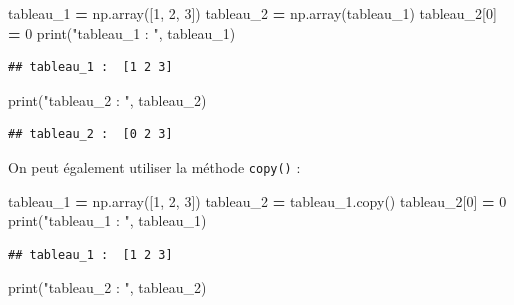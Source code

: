 \documentclass[12pt,]{book}
\newenvironment{Shaded}{\begin{snugshade}}{\end{snugshade}}
\newcommand{\DecValTok}[1]{\textcolor[rgb]{0.00,0.00,0.81}{#1}}
\newcommand{\StringTok}[1]{\textcolor[rgb]{0.31,0.60,0.02}{#1}}
\newcommand{\OperatorTok}[1]{\textcolor[rgb]{0.81,0.36,0.00}{\textbf{#1}}}
\newcommand{\BuiltInTok}[1]{#1}
\newcommand{\NormalTok}[1]{#1}
\numberwithin{equation}{section}
\numberwithin{countremarque}{section}
\begin{document}
\begin{Shaded}
\begin{Highlighting}[]
\NormalTok{tableau_1 }\OperatorTok{=}\NormalTok{ np.array([}\DecValTok{1}\NormalTok{, }\DecValTok{2}\NormalTok{, }\DecValTok{3}\NormalTok{])}
\NormalTok{tableau_2 }\OperatorTok{=}\NormalTok{ np.array(tableau_1)}
\NormalTok{tableau_2[}\DecValTok{0}\NormalTok{] }\OperatorTok{=} \DecValTok{0}
\BuiltInTok{print}\NormalTok{(}\StringTok{"tableau_1 : "}\NormalTok{, tableau_1)}
\end{Highlighting}
\end{Shaded}

\begin{lstlisting}
## tableau_1 :  [1 2 3]
\end{lstlisting}

\begin{Shaded}
\begin{Highlighting}[]
\BuiltInTok{print}\NormalTok{(}\StringTok{"tableau_2 : "}\NormalTok{, tableau_2)}
\end{Highlighting}
\end{Shaded}

\begin{lstlisting}
## tableau_2 :  [0 2 3]
\end{lstlisting}

On peut également utiliser la méthode \texttt{copy()} :

\begin{Shaded}
\begin{Highlighting}[]
\NormalTok{tableau_1 }\OperatorTok{=}\NormalTok{ np.array([}\DecValTok{1}\NormalTok{, }\DecValTok{2}\NormalTok{, }\DecValTok{3}\NormalTok{])}
\NormalTok{tableau_2 }\OperatorTok{=}\NormalTok{ tableau_1.copy()}
\NormalTok{tableau_2[}\DecValTok{0}\NormalTok{] }\OperatorTok{=} \DecValTok{0}
\BuiltInTok{print}\NormalTok{(}\StringTok{"tableau_1 : "}\NormalTok{, tableau_1)}
\end{Highlighting}
\end{Shaded}

\begin{lstlisting}
## tableau_1 :  [1 2 3]
\end{lstlisting}

\begin{Shaded}
\begin{Highlighting}[]
\BuiltInTok{print}\NormalTok{(}\StringTok{"tableau_2 : "}\NormalTok{, tableau_2)}
\end{Highlighting}
\end{Shaded}
\end{document}
